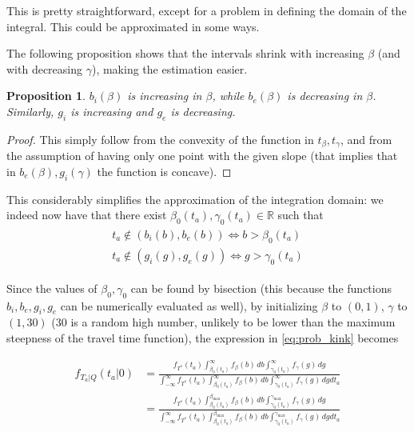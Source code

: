 \documentclass{article}
\newtheorem{prop}{Proposition}
\begin{document}
This is pretty straightforward, except for a problem in defining the domain of the integral.
This could be approximated in some ways.

The following proposition shows that the intervals shrink with increasing \(\beta\) (and with decreasing \(\gamma\)), making the estimation easier.
\begin{prop}
  \(b_i(\beta)\) is increasing in \(\beta\), while \(b_e(\beta)\) is decreasing in \(\beta\).
  Similarly, \(g_i\) is increasing and \(g_e\) is decreasing.
\end{prop}
\begin{proof}
  This simply follow from the convexity of the function in \(t_\beta, t_\gamma\), and from the assumption of having only one point with the given slope (that implies that in \(b_e(\beta), g_i(\gamma)\) the function is concave).
\end{proof}
This considerably simplifies the approximation of the integration domain:
we indeed now have that there exist \(\beta_0(t_a), \gamma_0(t_a) \in \mathbb{R}\) such that
\begin{align}
  \label{eq:threshold_integration}
  \begin{split}
     t_a \not\in (b_i(b), b_e(b)) \iff b > \beta_0(t_a) \\
    t_a \not\in (g_i(g), g_e(g)) \iff g > \gamma_0(t_a)
  \end{split}
\end{align}

Since the values of \(\beta_0, \gamma_0\) can be found by bisection (this because the functions \(b_i, b_e, g_i, g_e\) can be numerically evaluated as well), by initializing \(\beta\) to \((0, 1)\), \(\gamma\) to \((1, 30)\) (30 is a random high number, unlikely to be lower than the maximum steepness of the travel time function), the expression in \eqref{eq:prob_kink} becomes

\begin{align*}
  f_{T_a | Q}(t_a | 0) & = \frac{f_{T^*}(t_a)\int_{\beta_0(t_a)}^\infty f_\beta(b)\, db\int_{\gamma_0(t_a)}^\infty f_\gamma(g)\, dg}{\int_{-\infty}^\infty f_{T^*}(t_a)\int_{\beta_0(t_a)}^\infty f_\beta(b)\, db\int_{\gamma_0(t_a)}^\infty f_\gamma(g)\, dgdt_a} \\
  & = \frac{f_{T^*}(t_a)\int_{\beta_0(t_a)}^{\beta_\text{max}}f_\beta(b)\, db\int_{\gamma_0(t_a)}^{\gamma_\text{max}}f_\gamma(g)\, dg}{\int_{-\infty}^\infty f_{T^*}(t_a)\int_{\beta_0(t_a)}^{\beta_\text{max}}f_\beta(b)\, db\int_{\gamma_0(t_a)}^{\gamma_\text{max}}f_\gamma(g)\, dgdt_a}
\end{align*}
\end{document}
